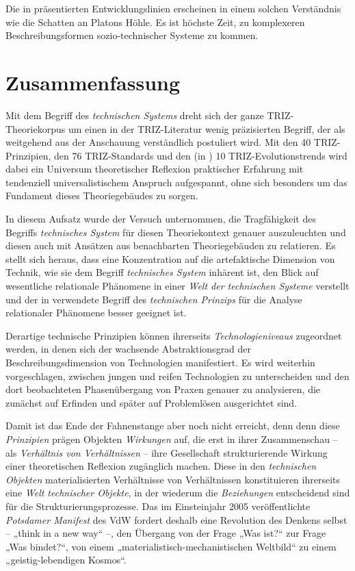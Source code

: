 \documentclass[12pt,a4paper]{article}
\begin{document}
Die in \cite{TESE2018} präsentierten Entwicklungslinien erscheinen in einem
solchen Verständnis wie die Schatten an Platons Höhle. Es ist höchste Zeit, zu
komplexeren Beschreibungsformen sozio-technischer Systeme zu kommen.

\section{Zusammenfassung}

Mit dem Begriff des \emph{technischen Systems} dreht sich der ganze
TRIZ-Theoriekorpus um einen in der TRIZ-Literatur wenig präzisierten Begriff,
der als weitgehend aus der Anschauung verständlich postuliert wird. Mit den 40
TRIZ-Prinzipien, den 76 TRIZ-Standards und den (in \cite{TESE2018}) 10
TRIZ-Evolutionstrends wird dabei ein Universum theoretischer Reflexion
praktischer Erfahrung mit tendenziell universalistischem Anspruch aufgespannt,
ohne sich besonders um das Fundament dieses Theoriegebäudes zu sorgen. 

In diesem Aufsatz wurde der Versuch unternommen, die Tragfähigkeit des
Begriffs \emph{technisches System} für diesen Theoriekontext genauer
auszuleuchten und diesen auch mit Ansätzen aus benachbarten Theoriegebäuden zu
relatieren.  Es stellt sich heraus, dass eine Konzentration auf die
artefaktische Dimension von Technik, wie sie dem Begriff  \emph{technisches
  System} inhärent ist, den Blick auf wesentliche relationale Phänomene in
einer \emph{Welt der technischen Systeme} verstellt und der in
\cite{Shpakovsky2010} verwendete Begriff des \emph{technischen Prinzips} für
die Analyse relationaler Phänomene besser geeignet ist.

Derartige technische Prinzipien können ihrerseits \emph{Technologieniveaus}
zugeordnet werden, in denen sich der wachsende Abstraktionsgrad der
Beschreibungsdimension von Technologien manifestiert.  Es wird weiterhin
vorgeschlagen, zwischen jungen und reifen Technologien zu unterscheiden und
den dort beobachteten Phasenübergang von Praxen genauer zu analysieren, die
zunächst auf Erfinden und später auf Problemlösen ausgerichtet sind. 

Damit ist das Ende der Fahnenstange aber noch nicht erreicht, denn denn diese
\emph{Prinzipien} prägen Objekten \emph{Wirkungen} auf, die erst in ihrer
Zusammenschau -- als \emph{Verhältnis von Verhältnissen} -- ihre Gesellschaft
strukturierende Wirkung einer theoretischen Reflexion zugänglich machen.
Diese in den \emph{technischen Objekten} materialisierten Verhältnisse von
Verhältnissen konstituieren ihrerseits eine \emph{Welt technischer Objekte},
in der wiederum die \emph{Beziehungen} entscheidend sind für die
Strukturierungsprozesse.  Das im Einsteinjahr 2005 veröffentlichte
\emph{Potsdamer Manifest} \cite{Duerr2005} des VdW fordert deshalb eine
Revolution des Denkens selbst -- „think in a new way“ --, den Übergang von der
Frage „Was ist?“ zur Frage „Was bindet?“, von einem
„materialistisch-mechanistischen Weltbild“ zu einem „geistig-lebendigen
Kosmos“.
\end{document}
